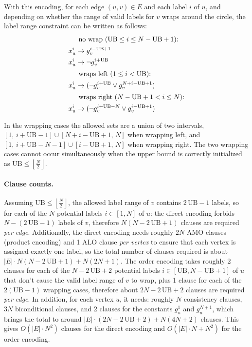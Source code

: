 \documentclass[a4paper,fleqn]{cas-sc}
\begin{document}
            \vspace{1em}

            With this encoding, for each edge $(u,v)\in E$ and each label $i$ of $u$, and depending on whether the range of valid labels for $v$ wraps around the circle, the label range constraint can be written as follows:
            \begin{align}
                \intertext{\hspace*{\parindent}no wrap $(\text{UB} \le i \le N-\text{UB}+1)$:}
                x_u^i &\rightarrow g_v^{i-\text{UB}+1} \\
                x_u^i &\rightarrow \neg g_v^{i+\text{UB}} \\
                \intertext{\hspace*{\parindent}wraps left $(1 \leq i < \text{UB})$:}
                x_u^i &\rightarrow (\neg g_v^{i+\text{UB}} \vee g_v^{N+i-\text{UB}+1}) \\
                \intertext{\hspace*{\parindent}wraps right $(N-\text{UB}+1 < i \leq N)$:}
                x_u^i &\rightarrow (\neg g_v^{i+\text{UB}-N} \vee g_v^{i-\text{UB}+1})
            \end{align}

            In the wrapping cases the allowed sets are a union of two intervals, $[1,\,i+\text{UB}-1] \cup [N+i-\text{UB}+1,\,N]$ when wrapping left, and $[1,\,i+\text{UB}-N-1] \cup [i-\text{UB}+1,\,N]$ when wrapping right. The two wrapping cases cannot occur simultaneously when the upper bound is correctly initialized as $\text{UB} \le \left\lfloor \frac{N}{2} \right\rfloor$.

        \paragraph{\textbf{Clause counts.}}
            Assuming $\text{UB} \le \left\lfloor \frac{N}{2} \right\rfloor$, the allowed label range of $v$ contains $2\,\text{UB}-1$ labels, so for each of the $N$ potential labels $i\in [1,N]$ of $u$: the direct encoding forbids $N-(2\,\text{UB}-1)$ labels of $v$, therefore $N(N-2\,\text{UB}+1)$ clauses are required \textit{per edge}. Additionally, the direct encoding needs roughly $2N$ $\text{AMO}$ clauses (product encoding) and 1 $\text{ALO}$ clause \textit{per vertex} to ensure that each vertex is assigned exactly one label, so the total number of clauses required is about $|E|\cdot N(N-2\,\text{UB}+1) + N(2N+1)$. The order encoding takes roughly 2 clauses for each of the $N-2\,\text{UB}+2$ potential labels $i\in [\text{UB},N-\text{UB}+1]$ of $u$ that don't cause the valid label range of $v$ to wrap, plus 1 clause for each of the $2(\text{UB}-1)$ wrapping cases, therefore about $2N-2\,\text{UB}+2$ clauses are required \textit{per edge}. In addition, for each vertex $u$, it needs: roughly $N$ consistency clauses, $3N$ biconditional clauses, and 2 clauses for the constants $g_u^1$ and $g_u^{N+1}$, which brings the total to around $|E|\cdot (2N-2\,\text{UB}+2) + N(4N+2)$ clauses. This gives $O(|E|\cdot N^2)$ clauses for the direct encoding and $O(|E|\cdot N + N^2)$ for the order encoding.
\end{document}
